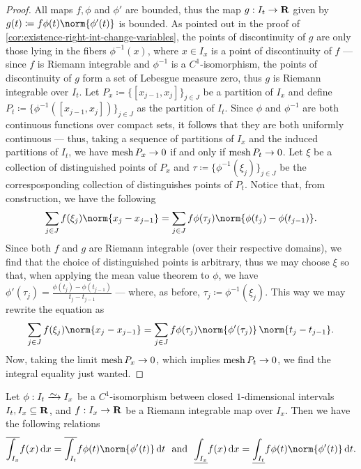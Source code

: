 \begin{proof}
All maps \(f, \phi\) and \(\phi'\) are bounded, thus the map \(g: I_t \to \mathbf{R}\)
given by \(g(t) \coloneq f \phi(t) \norm{\phi'(t)}\) is bounded. As pointed out
in the proof of \cref{cor:existence-right-int-change-variables}, the points of
discontinuity of \(g\) are only those lying in the fibers \(\phi^{-1}(x)\),
where \(x \in I_x\) is a point of discontinuity of \(f\) --- since \(f\) is
Riemann integrable and \(\phi^{-1}\) is a \(C^1\)-isomorphism, the points of
discontinuity of \(g\) form a set of Lebesgue measure zero, thus \(g\) is
Riemann integrable over \(I_t\). Let \(P_x \coloneq \{[x_{j-1}, x_{j}]\}_{j \in
J}\) be a partition of \(I_x\) and define \(P_t \coloneq \{\phi^{-1}([x_{j-1},
x_j])\}_{j \in J}\) as the partition of \(I_t\). Since \(\phi\) and
\(\phi^{-1}\) are both continuous functions over compact sets, it follows that
they are both uniformly continuous --- thus, taking a sequence of partitions
of \(I_x\) and the induced partitions of \(I_t\), we have \(\operatorname{mesh} P_x \to 0\) if
and only if \(\operatorname{mesh} P_t \to 0\). Let \(\xi\) be a collection of distinguished
points of \(P_x\) and \(\tau \coloneq \{\phi^{-1}(\xi_{j})\}_{j \in J}\) be the
corresposponding collection of distinguishes points of \(P_t\). Notice that,
from construction, we have the following
\[
  \sum_{j \in J} f(\xi_{j}) \norm{x_j - x_{j-1}}
  = \sum_{j \in J} f \phi(\tau_j) \norm{\phi(t_j) - \phi(t_{j-1})}.
\]
Since both \(f\) and \(g\) are Riemann integrable (over their respective
domains), we find that the choice of distinguished points is arbitrary, thus we
may choose \(\xi\) so that, when applying the mean value theorem to \(\phi\), we
have \(\phi'(\tau_j) = \frac{\phi(t_j) - \phi(t_{j-1})}{t_j - t_{j-1}}\) ---
where, as before, \(\tau_j \coloneq \phi^{-1}(\xi_j)\). This way we may rewrite
the equation as
\[
  \sum_{j \in J} f(\xi_{j}) \norm{x_j - x_{j-1}}
  = \sum_{j \in J} f \phi(\tau_{j}) \norm{\phi'(\tau_{j})}\,
  \norm{t_j - t_{j - 1}}.
\]
Now, taking the limit \(\operatorname{mesh} P_x \to 0\), which implies \(\operatorname{mesh} P_t \to 0\), we
find the integral equality just wanted.
\end{proof}

\begin{corollary}
\label{cor:C1-isomorphism-intervals-upper-lower-integral}
Let \(\phi: I_t \isoto I_x\) be a \(C^1\)-isomorphism between closed
\(1\)-dimensional intervals \(I_t, I_x \subseteq \mathbf{R}\), and \(f: I_x \to \mathbf{R}\) be
a Riemann integrable map over \(I_{x}\). Then we have the following relations
\[
  \overline{\int_{I_x}} f(x)\, \diff x
  = \overline{\int_{I_t}} f \phi(t) \norm{\phi'(t)}\, \diff t
  \ \text{ and }\
  \underline{\int_{I_x}} f(x)\, \diff x
  = \underline{\int_{I_t}} f \phi(t) \norm{\phi'(t)}\, \diff t.
\]
\end{corollary}

